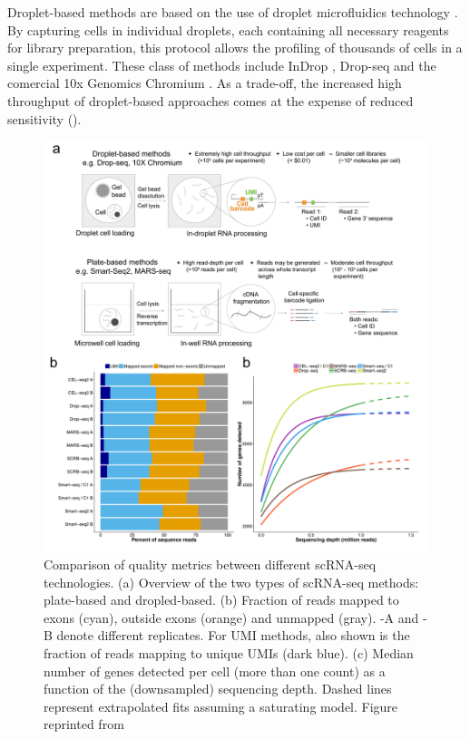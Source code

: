Droplet-based methods are based on the use of droplet microfluidics technology \cite{Zhang2019}. By capturing cells in individual droplets, each containing all necessary reagents for library preparation, this protocol allows the profiling of thousands of cells in a single experiment. These class of methods include InDrop \cite{Klein2015,Zilionis2016}, Drop-seq\cite{Macosko2015} and the comercial 10x Genomics Chromium \cite{Zheng2017}. As a trade-off, the increased high throughput of droplet-based approaches comes at the expense of reduced sensitivity\cite{Ziegenhain2017,Wang2019,Svensson2017} ().

\begin{figure}[H]
	\centering
	\includegraphics[width=0.85\linewidth]{scRNA_seq_comparison}
	\caption[]{Comparison of quality metrics between different scRNA-seq technologies. (a) Overview of the two types of scRNA-seq methods: plate-based and dropled-based. (b) Fraction of reads mapped to exons (cyan), outside exons (orange) and unmapped (gray). -A and -B denote different replicates. For UMI methods, also shown is the fraction of reads mapping to unique UMIs (dark blue). (c) Median number of genes detected per cell (more than one count) as a function of the (downsampled) sequencing depth. Dashed lines represent extrapolated fits assuming a saturating model. Figure reprinted from \cite{Ziegenhain2017} }
	\label{fig:scRNA_seq_comparison}
\end{figure}

